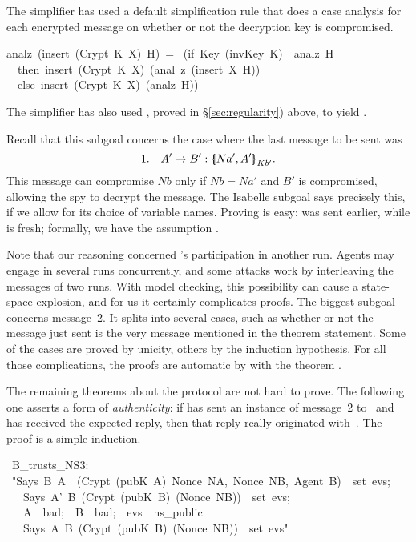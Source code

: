 %
The simplifier has used a 
default simplification rule that does a case
analysis for each encrypted message on whether or not the decryption key
is compromised.
\begin{isabelle} 
analz\ (insert\ (Crypt\ K\ X)\ H)\ =\isanewline 
\ (if\ Key\ (invKey\ K)\ \isasymin \ analz\ H\isanewline
\ \ then\ insert\
(Crypt\ K\ X)\ (anal\ z\ (insert\ X\ H))\isanewline 
\ \ else\ insert\ (Crypt\ K\ X)\ (analz\ H)) 
\end{isabelle} 
The simplifier has also used , proved in
\S\ref{sec:regularity}) above, to yield .

Recall that this subgoal concerns the case
where the last message to be sent was
\[ 1.\quad  A'\to B'  : \mathopen{\{\kern-.30em|} Na',A'\mathclose{|\kern-.32em\}}\sb{Kb'}. \]
This message can compromise $Nb$ only if $Nb=Na'$ and $B'$ is compromised,
allowing the spy to decrypt the message.  The Isabelle subgoal says
precisely this, if we allow for its choice of variable names.
Proving  is easy:  was
sent earlier, while  is fresh; formally, we have
the assumption
. 

Note that our reasoning concerned 's participation in another
run.  Agents may engage in several runs concurrently, and some attacks work
by interleaving the messages of two runs.  With model checking, this
possibility can cause a state-space explosion, and for us it
certainly complicates proofs.  The biggest subgoal concerns message~2.  It
splits into several cases, such as whether or not the message just sent is
the very message mentioned in the theorem statement.
Some of the cases are proved by unicity, others by
the induction hypothesis.  For all those complications, the proofs are
automatic by \isa{blast} with the theorem \isa{no_nonce_NS1_NS2}.

The remaining theorems about the protocol are not hard to prove.  The
following one asserts a form of \emph{authenticity}: if
 has sent an instance of message~2 to~ and has received the
expected reply, then that reply really originated with~\isa{A}.  The
proof is a simple induction.
\begin{isabelle}
\ B_trusts_NS3:\isanewline
\ "\isasymlbrakk Says\ B\ A\ \ (Crypt\ (pubK\ A)\ \isasymlbrace Nonce\ NA,\ Nonce\ NB,\ Agent\ B\isasymrbrace )\ \isasymin \ set\ evs;\isanewline
\ \ \ Says\ A'\ B\ (Crypt\ (pubK\ B)\ (Nonce\ NB))\ \isasymin \ set\ evs;\ \isanewline
\ \ \ A\ \isasymnotin \ bad;\ \ B\ \isasymnotin \ bad;\ \ evs\ \isasymin \ ns_public\isasymrbrakk \ \ \ \ \ \ \ \ \isanewline
\ \ \isasymLongrightarrow \ Says\ A\ B\ (Crypt\ (pubK\ B)\ (Nonce\ NB))\ \isasymin \ set\
evs"
\end{isabelle}

